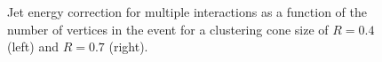 \begin{figure}[p]
 \centering
{}
\caption{Jet energy correction for multiple \ppbar interactions as a function of the number of vertices in the event for a clustering cone size of $R=0.4$ (left) and $R=0.7$ (right).}
 \label{fig:JetCorrections_MI}
\end{figure}

